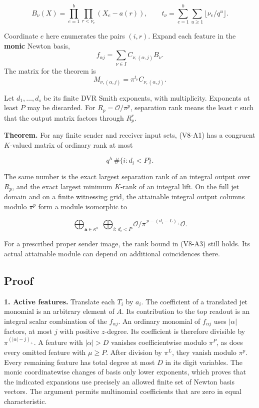 \documentclass[
  11pt,
]{article}
\begin{document}
\[
 B_\nu(X)=\prod_{e=1}^b\prod_{r<\nu_e}(X_e-a(r)),\qquad
 t_\nu=\sum_{e=1}^b\sum_{u\ge1}\lfloor\nu_e/q^u\rfloor.
\]

Coordinate \(e\) here enumerates the pairs \((i,r)\). Expand each
feature in the \textbf{monic} Newton basis, \[
 f_{\alpha j}=\sum_{\nu\in I} C_{\nu,(\alpha,j)} B_\nu.
\] The matrix for the theorem is \[
                 M_{\nu,(\alpha,j)}=\pi^{t_\nu} C_{\nu,(\alpha,j)}.
                 \tag{V8-A2}
\]

Let \(d_1,\ldots,d_s\) be its finite DVR Smith exponents, with
multiplicity. Exponents at least \(P\) may be discarded. For
\(R_p=\mathcal O/\pi^p\), separation rank means the least \(r\) such
that the output matrix factors through \(R_p^r\).

\textbf{Theorem.} For any finite sender and receiver input sets, (V8-A1)
has a congruent \(K\)-valued matrix of ordinary rank at most

\[
                        q^h\,\#\{i:d_i<P\}.                       \tag{V8-A3}
\]

The same number is the exact largest separation rank of an integral
output over \(R_p\), and the exact largest minimum \(K\)-rank of an
integral lift. On the full jet domain and on a finite witnessing grid,
the attainable integral output columns modulo \(\pi^p\) form a module
isomorphic to

\[
 \bigoplus_{\boldsymbol a\in\kappa^h}
 \ \bigoplus_{i:\,d_i<P}\mathcal O/\pi^{\,p-(d_i-L)_+}\mathcal O .
                                                                    \tag{V8-A4}
\]

For a prescribed proper sender image, the rank bound in (V8-A3) still
holds. Its actual attainable module can depend on additional
coincidences there.

\subsection{Proof}\label{v8-proof}

\textbf{1. Active features.} Translate each \(T_i\) by \(a_i\). The
coefficient of a translated jet monomial is an arbitrary element of
\(A\). Its contribution to the top readout is an integral scalar
combination of the \(f_{\alpha j}\). An ordinary monomial of
\(f_{\alpha j}\) uses \(|\alpha|\) factors, at most \(j\) with positive
\(z\)-degree. Its coefficient is therefore divisible by
\(\pi^{(|\alpha|-j)_+}\). A feature with \(|\alpha|>D\) vanishes
coefficientwise modulo \(\pi^P\), as does every omitted feature with
\(\mu\ge P\). After division by \(\pi^L\), they vanish modulo \(\pi^p\).
Every remaining feature has total degree at most \(D\) in its digit
variables. The monic coordinatewise changes of basis only lower
exponents, which proves that the indicated expansions use precisely an
allowed finite set of Newton basis vectors. The argument permits
multinomial coefficients that are zero in equal characteristic.
\end{document}
